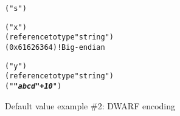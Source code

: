 \begin{figure}[h]
\begin{dwflisting}
\begin{alltt}

    \DWTAGsubprogram
       \DWATname ("s")

       \DWTAGformalparameter
          \DWATname ("x")
          \DWATtype (reference to type "string")
          \DWATdefaultvalue@\DWFORMdatafour (0x61626364)    ! Big-endian

       \DWTAGformalparameter
          \DWATname ("y")
          \DWATtype (reference to type "string")
          \DWATdefaultvalue@\DWFORMstring ("\textbf{\textsl{"abcd"+10}}")

\end{alltt}
\end{dwflisting}
\caption{Default value example \#2: DWARF encoding}
\label{fig:defaultvalueexampletwoDWARF}
\end{figure}


